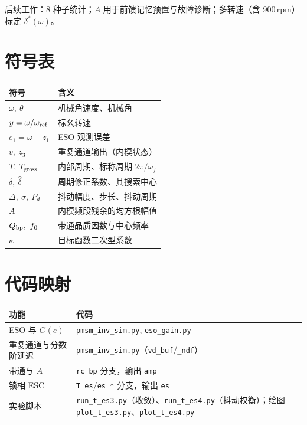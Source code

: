 \documentclass[UTF8,fontset=windows,a4paper,11pt]{ctexart}
\newcommand{\Tg}{T_{\mathrm{gross}}}
\begin{document}
后续工作：8 种子统计；$A$ 用于前馈记忆预置与故障诊断；多转速（含 900\,rpm）标定 $\delta^{*}(\omega)$。

\appendix
\section{符号表}
\begin{table}[h]
\centering
\begin{tabular}{@{}ll@{}}
\toprule
符号 & 含义 \\
\midrule
$\omega,\ \theta$ & 机械角速度、机械角 \\
$y=\omega/\omega_{\rm ref}$ & 标幺转速 \\
$e_1=\omega-z_1$ & ESO 观测误差 \\
$v,\ z_3$ & 重复通道输出（内模状态） \\
$T,\ \Tg$ & 内部周期、标称周期 $2\pi/\omega_f$ \\
$\delta,\ \hat\delta$ & 周期修正系数、其搜索中心 \\
$\Delta,\ \sigma,\ P_d$ & 抖动幅度、步长、抖动周期 \\
$A$ & 内模频段残余的均方根幅值 \\
$Q_{\rm bp},\ f_0$ & 带通品质因数与中心频率 \\
$\kappa$ & 目标函数二次型系数 \\
\bottomrule
\end{tabular}
\end{table}

\section{代码映射}
\begin{table}[h]
\centering
\begin{tabular}{@{}ll@{}}
\toprule
功能 & 代码 \\
\midrule
ESO 与 $G(e)$ & \texttt{pmsm\_inv\_sim.py}, \texttt{eso\_gain.py} \\
重复通道与分数阶延迟 & \texttt{pmsm\_inv\_sim.py}（\texttt{vd\_buf}/\texttt{\_ndf}） \\
带通与 $A$ & \texttt{rc\_bp} 分支，输出 \texttt{amp} \\
锁相 ESC & \texttt{T\_es}/\texttt{es\_*} 分支，输出 \texttt{es} \\
实验脚本 & \texttt{run\_t\_es3.py}（收敛）、\texttt{run\_t\_es4.py}（抖动权衡）；绘图 \texttt{plot\_t\_es3.py}、\texttt{plot\_t\_es4.py} \\
\bottomrule
\end{tabular}
\end{table}
\end{document}
